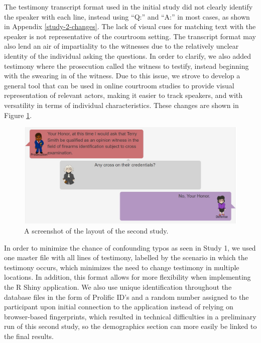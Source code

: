 \documentclass[print]{nuthesis}
\begin{document}
The testimony transcript format used in the initial study did not clearly identify the speaker with each line, instead using ``Q:'' and ``A:'' in most cases, as shown in Appendix \ref{study-2-changes}.
The lack of visual cues for matching text with the speaker is not representative of the courtroom setting.
The transcript format may also lend an air of impartiality to the witnesses due to the relatively unclear identity of the individual asking the questions.
In order to clarify, we also added testimony where the prosecution called the witness to testify, instead beginning with the swearing in of the witness.
Due to this issue, we strove to develop a general tool that can be used in online courtroom studies to provide visual representation of relevant actors, making it easier to track speakers, and with versatility in terms of individual characteristics.
These changes are shown in Figure \ref{fig:testimonyformat}.

\begin{figure}

{\centering \includegraphics[width=1\linewidth]{images/Study2_Screenshot2} 

}

\caption{A screenshot of the layout of the second study.}\label{fig:testimonyformat}
\end{figure}

In order to minimize the chance of confounding typos as seen in Study 1, we used one master file with all lines of testimony, labelled by the scenario in which the testimony occurs, which minimizes the need to change testimony in multiple locations.
In addition, this format allows for more flexibility when implementing the R Shiny application.
We also use unique identification throughout the database files in the form of Prolific ID's and a random number assigned to the participant upon initial connection to the application instead of relying on browser-based fingerprints, which resulted in technical difficulties in a preliminary run of this second study, so the demographics section can more easily be linked to the final results.
\end{document}
